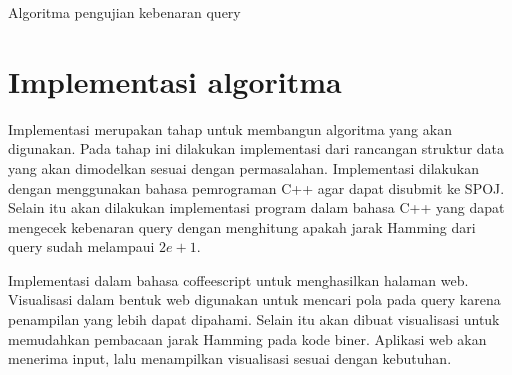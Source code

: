 \begin{algorithm}[h]
\caption{Algoritma pengujian kebenaran query}
\label{alg:query_assert}
\end{algorithm}


\section{Implementasi algoritma}

Implementasi merupakan tahap untuk membangun algoritma yang akan digunakan. Pada tahap ini dilakukan implementasi dari rancangan struktur data yang akan dimodelkan sesuai dengan permasalahan. Implementasi dilakukan dengan menggunakan bahasa pemrograman C++ agar dapat disubmit ke SPOJ. Selain itu akan dilakukan implementasi program dalam bahasa C++ yang dapat mengecek kebenaran query dengan menghitung apakah jarak Hamming dari query sudah melampaui $2e+1$.

Implementasi dalam bahasa coffeescript untuk menghasilkan halaman web. Visualisasi dalam bentuk web digunakan untuk mencari pola pada query karena penampilan yang lebih dapat dipahami. Selain itu akan dibuat visualisasi untuk memudahkan pembacaan jarak Hamming pada kode biner. Aplikasi web akan menerima input, lalu menampilkan visualisasi sesuai dengan kebutuhan.

